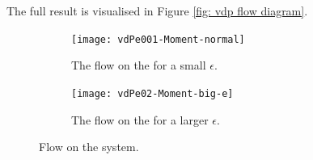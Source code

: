 The full result is visualised in Figure \ref{fig: vdp flow diagram}.
\begin{figure}[h!]\centering
		\begin{subfigure}[t]{0.45\textwidth}
			\centering
			\texttt{[image: vdPe001-Moment-normal]}
			\caption{The flow on the \vdp for a small $ \epsilon $.} \label{fig: vdp normal}
		\end{subfigure}
		\hfill
		\begin{subfigure}[t]{0.45\textwidth}
			\centering
			\texttt{[image: vdPe02-Moment-big-e]}
			\caption{The flow on the \vdp for a larger $ \epsilon $.} \label{fig: vdp big e}
		\end{subfigure}
		
	\caption{Flow on the \vdp system.}
	\label{fig: vdp flow diagram e}
\end{figure}

























